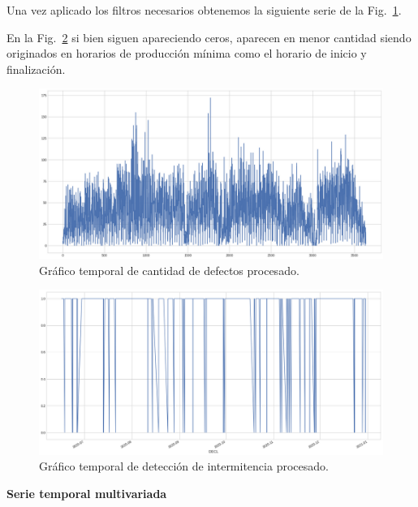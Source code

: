 \documentclass[a4paper,12pt]{article}
\begin{document}
		Una vez aplicado los filtros necesarios obtenemos la siguiente serie de la Fig.~\ref{fig:graf_cantdef_desp}. 
				
		En la Fig.~\ref{fig:graf_inter_desp} si bien siguen apareciendo ceros, aparecen en menor cantidad siendo originados en horarios de producción mínima como el horario de inicio y finalización.
						
		\begin{figure}[]
			\begin{center}
				\includegraphics[width=1\textwidth]{tesis_80.png}
				\caption{Gráfico temporal de cantidad de defectos procesado.}
				\label{fig:graf_cantdef_desp}
			\end{center}
		\end{figure}
						
		\begin{figure}[]
			\begin{center}
				\includegraphics[width=1\textwidth]{tesis_81.png}
				\caption{Gráfico temporal de detección de intermitencia  procesado.}
				\label{fig:graf_inter_desp}
			\end{center}
		\end{figure}
						
		\textbf{Serie temporal multivariada}
						
\end{document}
